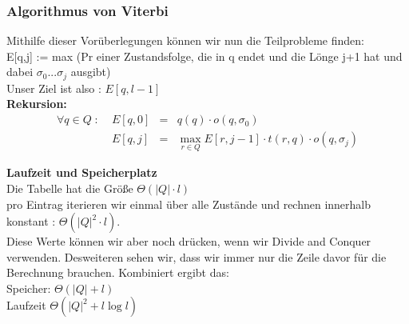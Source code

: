\subsubsection{Algorithmus von Viterbi}

Mithilfe dieser Vorüberlegungen können wir nun die Teilprobleme finden:\\
E[q,j] := max (Pr einer Zustandsfolge, die in q endet und die Lönge j+1 hat und dabei $\sigma_0 ... \sigma_j$ ausgibt)\\

Unser Ziel ist also : $E[q,l-1]$\\

\textbf{Rekursion:}\\
$$
\begin{array}{lrcl}
\forall q\in Q \; : \; & E[q,0] &=& q(q) \cdot o(q,\sigma_0)\\
& E[q,j] &=& \underset{r\in Q}{\max} E [r,j-1] \cdot t(r,q) \cdot o(q,\sigma_j) 
\end{array}
$$

\textbf{Laufzeit und Speicherplatz}\\
Die Tabelle hat die Größe $\Theta ( | Q | \cdot l)$\\
pro Eintrag iterieren wir einmal über alle Zustände und rechnen innerhalb konstant : $\Theta (| Q | ^2 \cdot l)$.\\

Diese Werte können wir aber noch drücken, wenn wir Divide and Conquer verwenden. Desweiteren sehen wir, dass wir immer nur die Zeile davor für die Berechnung brauchen. Kombiniert ergibt das:\\
Speicher: $\Theta (| Q | + l)$\\
Laufzeit $\Theta (| Q |^2 + l \log l )$